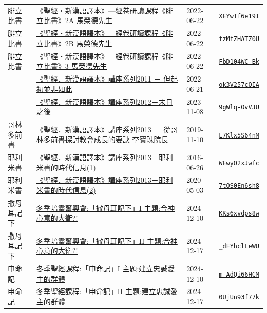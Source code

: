\documentclass{book}
\begin{document}
{\begin{xltabular}{\textwidth}{|p{0.15\textwidth} p{0.6\textwidth}|p{0.07\textwidth} p{0.1\textwidth}|}
腓立比書   & \hyperref[sec:XEYwTf6e19I]{《聖經‧新漢語譯本》—經卷研讀課程《腓立比書》2A 馬榮德先生} & 2022-06-22 & \href{https://youtube.com/watch?v=XEYwTf6e19I}{\texttt{XEYwTf6e19I}} \\
腓立比書   & \hyperref[sec:fzMfZHATZ0U]{《聖經‧新漢語譯本》—經卷研讀課程《腓立比書》2B 馬榮德先生} & 2022-06-22 & \href{https://youtube.com/watch?v=fzMfZHATZ0U}{\texttt{fzMfZHATZ0U}} \\
腓立比書   & \hyperref[sec:FbD104WC_Bk]{《聖經‧新漢語譯本》—經卷研讀課程《腓立比書》3 馬榮德先生} & 2022-06-22 & \href{https://youtube.com/watch?v=FbD104WC-Bk}{\texttt{FbD104WC-Bk}} \\
    & \hyperref[sec:ok3V257cOIA]{《聖經．新漢語譯本》講座系列2011 － 但起初並非如此} & 2022-06-21 & \href{https://youtube.com/watch?v=ok3V257cOIA}{\texttt{ok3V257cOIA}} \\
    & \hyperref[sec:9gWlq_OvVJU]{《聖經．新漢語譯本》講座系列2012－末日之後} & 2023-11-08 & \href{https://youtube.com/watch?v=9gWlq-OvVJU}{\texttt{9gWlq-OvVJU}} \\
哥林多前書   & \hyperref[sec:L7Klx5S64nM]{《聖經．新漢語譯本》講座系列2013 － 從哥林多前書探討教會成長的要訣 李寶珠院長} & 2019-11-10 & \href{https://youtube.com/watch?v=L7Klx5S64nM}{\texttt{L7Klx5S64nM}} \\
耶利米書   & \hyperref[sec:WEwyO2xJwfc]{《聖經．新漢語譯本》講座系列2013－耶利米書的時代信息(1)} & 2016-06-26 & \href{https://youtube.com/watch?v=WEwyO2xJwfc}{\texttt{WEwyO2xJwfc}} \\
耶利米書   & \hyperref[sec:7tQS0En6sh8]{《聖經．新漢語譯本》講座系列2013－耶利米書的時代信息(2)} & 2020-05-03 & \href{https://youtube.com/watch?v=7tQS0En6sh8}{\texttt{7tQS0En6sh8}} \\
撒母耳記下   & \hyperref[sec:KKs6xvdps8w]{冬季培靈奮興會:「撒母耳記下」I  主題:合神心意的大衛?!} & 2024-12-10 & \href{https://youtube.com/watch?v=KKs6xvdps8w}{\texttt{KKs6xvdps8w}} \\
撒母耳記下   & \hyperref[sec:_dFYhclLeWU]{冬季培靈奮興會:「撒母耳記下」II 主題:合神心意的大衛?!} & 2024-12-17 & \href{https://youtube.com/watch?v=_dFYhclLeWU}{\texttt{\_dFYhclLeWU}} \\
申命記   & \hyperref[sec:m_AdQi66HCM]{冬季聖經課程:「申命記」I 主題:建立忠誠愛主的群體} & 2024-12-10 & \href{https://youtube.com/watch?v=m-AdQi66HCM}{\texttt{m-AdQi66HCM}} \\
申命記   & \hyperref[sec:0UjUn93f77k]{冬季聖經課程:「申命記」II 主題:建立忠誠愛主的群體} & 2024-12-17 & \href{https://youtube.com/watch?v=0UjUn93f77k}{\texttt{0UjUn93f77k}} \\

\end{xltabular}}
\end{document}
